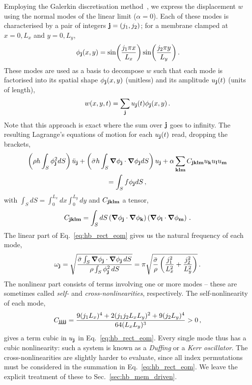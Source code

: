 Employing the Galerkin discretisation method~\cite{Nayfeh_Mook}, we express the displacement $w$ using the normal modes of the linear limit ($\alpha=0$). Each of these modes is characterised by a pair of integers $\vb{j} = (j_1, j_2)$; for a membrane clamped at $x = 0, L_x$ and $y = 0, L_y$,
\begin{equation} \label{eq:hb_rect_modes}
\phi_{\vb{j}}(x,y) = \sin(\frac{j_1 \pi x}{L_x}) \sin(\frac{j_2 \pi y}{L_y})\,.
\end{equation}
These modes are used as a basis to decompose $w$ such that each mode is factorised into its spatial shape $\phi_{\vb{j}}(x,y)$ (unitless) and its amplitude $u_{\vb{j}}(t)$ (units of length),
\begin{equation}
w(x,y,t) = \sum_{\vb{j}} u_{\vb{j}}(t) \phi_{\vb{j}}(x,y)\,.
\end{equation}
Note that this approach is exact where the sum over $\vb{j}$ goes to infinity. The resulting Lagrange's equations of motion for each $u_{\vb{j}}(t)$ read, dropping the brackets,
\begin{multline} \label{eq:hb_rect_eom}
\left( \rho h \int_S \phi_{\vb{j}}^2 dS \right) \ddot{u}_{\vb{j}} + \left(\bar{\sigma} h \int_S \grad \phi_{\vb{j}} \cdot \grad \phi_{\vb{j}} dS \right) u_{\vb{j}} + \alpha \sum_{\vb{k} \vb{l} \vb{m}} C_{\vb{j} \vb{k} \vb{l} \vb{m}} u_{\vb{k}} u_{\vb{l}} u_{\vb{m}}\\ = \int_S f \phi_{\vb{j}} dS\,,
\end{multline}
with $ \int_S dS = \int_{0}^{L_x} dx \int_0^{L_y} dy$ and $C_{\vb{j} \vb{k} \vb{l} \vb{m}}$ a tensor,
\begin{equation} \label{eq:hb_rect_C}
C_{\vb{j} \vb{k} \vb{l} \vb{m}} = \int_S dS \left(\grad \phi_{\vb{j}} \cdot \grad \phi_{\vb{k}}  \right)  \left(\grad \phi_{\vb{l}} \cdot \grad \phi_{\vb{m}}  \right)\,.
\end{equation}
The linear part of Eq.~\eqref{eq:hb_rect_eom} gives us the natural frequency of each mode,
\begin{equation}
\omega_{\vb{j}}= \sqrt{\frac{\bar{\sigma} \int_S \grad \phi_{\vb{j}} \cdot \grad \phi_{\vb{j}}\, dS}{ \rho \int_S \phi_{\vb{j}}^2 \,dS}} = \pi \sqrt{ \frac{\bar{\sigma}}{\rho}  \left(\frac{j_1^2}{L_x^2} + \frac{j_2^2}{L_y^2} \right)} \,.
\end{equation}
The nonlinear part consists of terms involving one or more modes -- these are sometimes called \textit{self-} and \textit{cross-nonlinearities}, respectively. The self-nonlinearity of each mode, 
\begin{equation}
C_{\vb{j} \vb{j} \vb{j} \vb{j}} = \frac{9 (j_1 L_x)^4 + 2 (j_1 j_2 L_x L_y)^2 + 9 (j_2 L_y)^4}{64 (L_x L_y)^3} > 0 \,,
\end{equation}
gives a term cubic in $u_{\vb{j}}$ in Eq.~\eqref{eq:hb_rect_eom}. Every single mode thus has a cubic nonlinearity: such a system is known as a \textit{Duffing} or a \textit{Kerr oscillator}. The cross-nonlinearities are slightly harder to evaluate, since all index permutations must be considered in the summation in Eq.~\eqref{eq:hb_rect_eom}. We leave the explicit treatment of these to Sec.~\ref{sec:hb_mem_driven}.

